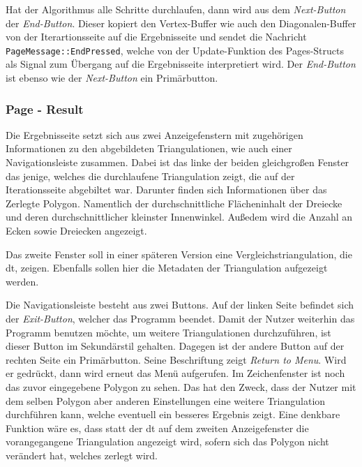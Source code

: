 Hat der Algorithmus alle Schritte durchlaufen, dann wird aus dem \emph{Next-Button} der \emph{End-Button}. Dieser kopiert den Vertex-Buffer wie auch den Diagonalen-Buffer von der Iterartionsseite auf die Ergebnisseite 
und sendet die Nachricht \lstinline{PageMessage::EndPressed}, welche von der Update-Funktion des Pages-Structs als Signal zum Übergang auf die Ergebnisseite interpretiert wird. Der \emph{End-Button} ist ebenso wie der 
\emph{Next-Button} ein Primärbutton.

\subsubsection{Page - Result}

Die Ergebnisseite setzt sich aus zwei Anzeigefenstern mit zugehörigen Informationen zu den abgebildeten Triangulationen, wie auch einer Navigationsleiste zusammen.
Dabei ist das linke der beiden gleichgroßen Fenster das jenige, welches die durchlaufene Triangulation zeigt, die auf der Iterationsseite abgebiltet war. Darunter finden sich 
Informationen über das Zerlegte Polygon. Namentlich der durchschnittliche Flächeninhalt der Dreiecke und deren durchschnittlicher kleinster Innenwinkel. Außedem wird die Anzahl an Ecken sowie Dreiecken angezeigt.

Das zweite Fenster soll in einer späteren Version eine Vergleichstriangulation, die \ac{dt}, zeigen. Ebenfalls sollen hier die Metadaten der Triangulation aufgezeigt werden.

Die Navigationsleiste besteht aus zwei Buttons. Auf der linken Seite befindet sich der \emph{Exit-Button}, welcher das Programm beendet. Damit der Nutzer weiterhin das Programm benutzen möchte, um weitere Triangulationen durchzuführen,
ist dieser Button im Sekundärstil gehalten.
Dagegen ist der andere Button auf der rechten Seite ein Primärbutton. Seine Beschriftung zeigt \emph{Return to Menu}. Wird er gedrückt, dann wird erneut das Menü aufgerufen. Im Zeichenfenster ist noch das zuvor eingegebene Polygon zu sehen.
Das hat den Zweck, dass der Nutzer mit dem selben Polygon aber anderen Einstellungen eine weitere Triangulation durchführen kann, welche eventuell ein besseres Ergebnis zeigt.
Eine denkbare Funktion wäre es, dass statt der \ac{dt} auf dem zweiten Anzeigefenster die vorangegangene Triangulation angezeigt wird, sofern sich das Polygon nicht verändert hat, welches zerlegt wird.

